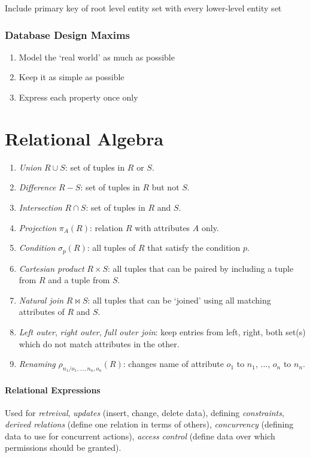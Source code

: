 \documentclass[twocolumn,english]{article}
\begin{document}
Include primary key of root level entity set with every lower-level
entity set


\subsubsection{Database Design Maxims}
\begin{enumerate}
\item Model the `real world' as much as possible
\item Keep it as simple as possible
\item Express each property once only
\end{enumerate}

\section{Relational Algebra}
\begin{enumerate}
\item \emph{Union} $R\cup S$: set of tuples in $R$ or $S$.
\item \emph{Difference} $R-S$: set of tuples in $R$ but not $S$.
\item \emph{Intersection} $R\cap S$: set of tuples in $R$ and $S$.
\item \emph{Projection} $\pi_{A}(R)$: relation $R$ with attributes $A$
only.
\item \emph{Condition} $\sigma_{p}(R)$: all tuples of $R$ that satisfy
the condition $p$.
\item \emph{Cartesian product} $R\times S$: all tuples that can be paired
by including a tuple from $R$ and a tuple from $S$.
\item \emph{Natural join} $R\bowtie S$: all tuples that can be `joined'
using all matching attributes of $R$ and $S$.
\item \emph{Left outer}, \emph{right outer}, \emph{full outer join}: keep
entries from left, right, both set(s) which do not match attributes
in the other.
\item \emph{Renaming} $\rho_{n_{1}/o_{1},\dots,n_{n},o_{n}}(R)$: changes
name of attribute $o_{1}$ to $n_{1}$, ..., $o_{n}$ to $n_{n}$.
\end{enumerate}

\paragraph{Relational Expressions}

Used for \emph{retreival}, \emph{updates} (insert, change, delete
data), defining \emph{constraints}, \emph{derived relations} (define
one relation in terms of others), \emph{concurrency} (defining data
to use for concurrent actions), \emph{access control} (define data
over which permissions should be granted).
\end{document}
